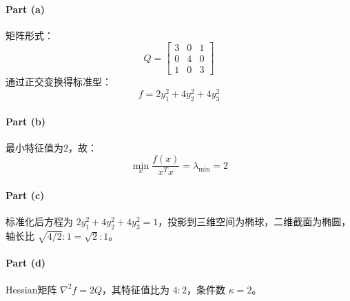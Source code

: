 \paragraph{Part (a)}  
矩阵形式：
\[
Q = \begin{bmatrix}
3 & 0 & 1 \\
0 & 4 & 0 \\
1 & 0 & 3
\end{bmatrix}
\]
通过正交变换得标准型：
\[
f = 2y_1^2 + 4y_2^2 + 4y_3^2
\]

\paragraph{Part (b)}  
最小特征值为2，故：
\[
\min_x \frac{f(x)}{x^T x} = \lambda_{\min} = 2
\]

\paragraph{Part (c)}  
标准化后方程为 \( 2y_1^2 + 4y_2^2 + 4y_3^2 = 1 \)，投影到三维空间为椭球，二维截面为椭圆，轴长比 \( \sqrt{4/2} : 1 = \sqrt{2} : 1 \)。

\paragraph{Part (d)}  
Hessian矩阵 \( \nabla^2 f = 2Q \)，其特征值比为 \( 4:2 \)，条件数 \( \kappa = 2 \)。